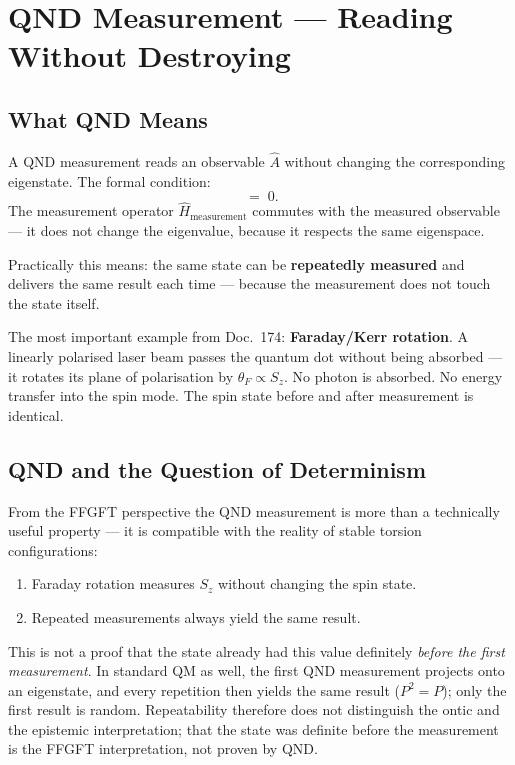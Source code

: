 \section{QND Measurement --- Reading Without Destroying}
\label{sec:qnd}

\subsection{What QND Means}

A QND measurement reads an observable $\hat{A}$
without changing the corresponding eigenstate.
The formal condition:
\begin{equation}
  [\hat{A},\; \hat{H}_\text{measurement}] \;=\; 0.
\end{equation}
The measurement operator $\hat{H}_\text{measurement}$ commutes
with the measured observable --- it does not change the
eigenvalue, because it respects the same eigenspace.

Practically this means: the same state can be
\textbf{repeatedly measured} and delivers
the same result each time --- because the measurement
does not touch the state itself.

The most important example from Doc.~174:
\textbf{Faraday/Kerr rotation}.
A linearly polarised laser beam passes the
quantum dot without being absorbed ---
it rotates its plane of polarisation by $\theta_F \propto S_z$.
No photon is absorbed. No energy transfer
into the spin mode. The spin state before and after
measurement is identical.

\subsection{QND and the Question of Determinism}
\label{sec:qnd-proof}

From the FFGFT perspective the QND measurement is more
than a technically useful property ---
it is compatible with the reality of stable torsion
configurations:

\begin{enumerate}
  \item Faraday rotation measures $S_z$ without
    changing the spin state.
  \item Repeated measurements always yield the same result.
\end{enumerate}

This is not a proof that the state already had this value
definitely \emph{before the first measurement}.
In standard QM as well, the first QND measurement projects
onto an eigenstate, and every repetition then yields the
same result ($P^2 = P$); only the first result is random.
Repeatability therefore does not distinguish the ontic and the
epistemic interpretation; that the state was definite before
the measurement is the FFGFT interpretation, not proven by QND.

